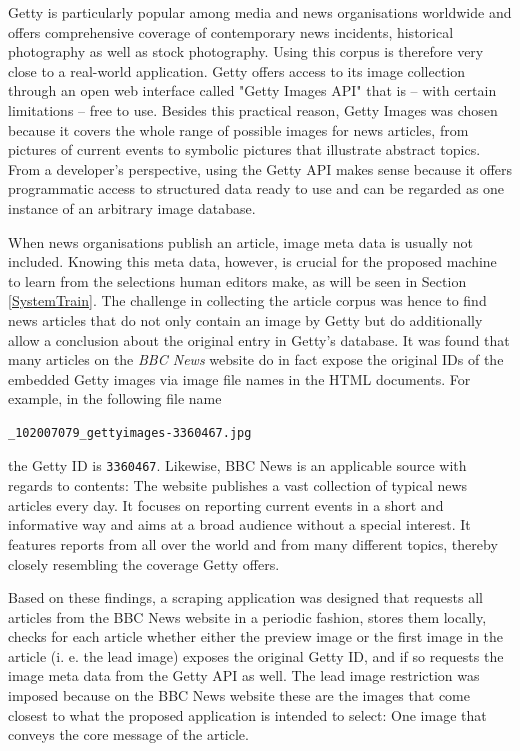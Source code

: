 \documentclass[11pt,a4paper,twoside]{article}
\begin{document}
Getty is particularly popular among media and news organisations worldwide and offers comprehensive coverage of contemporary news incidents, historical photography as well as stock photography. Using this corpus is therefore very close to a real-world application. Getty offers access to its image collection through an open web interface called "Getty Images API" \cite{GettyImagesAPIOverview} that is -- with certain limitations -- free to use. Besides this practical reason, Getty Images was chosen because it covers the whole range of possible images for news articles, from pictures of current events to symbolic pictures that illustrate abstract topics. From a developer's perspective, using the Getty API makes sense because it offers programmatic access to structured data ready to use and can be regarded as one instance of an arbitrary image database.

When news organisations publish an article, image meta data is usually not included. Knowing this meta data, however, is crucial for the proposed machine to learn from the selections human editors make, as will be seen in Section \ref{SystemTrain}. The challenge in collecting the article corpus was hence to find news articles that do not only contain an image by Getty but do additionally allow a conclusion about the original entry in Getty's database. It was found that many articles on the \emph{BBC News} website \cite{BBCBBCNews} do in fact expose the original IDs of the embedded Getty images via image file names in the HTML documents. For example, in the following file name

\begin{lstlisting}
_102007079_gettyimages-3360467.jpg
\end{lstlisting}

\noindent the Getty ID is \lstinline{3360467}. Likewise, BBC News is an applicable source with regards to contents: The website publishes a vast collection of typical news articles every day. It focuses on reporting current events in a short and informative way and aims at a broad audience without a special interest. It features reports from all over the world and from many different topics, thereby closely resembling the coverage Getty offers.

Based on these findings, a scraping application was designed that requests all articles from the BBC News website in a periodic fashion, stores them locally, checks for each article whether either the preview image or the first image in the article (i. e.  the lead image) exposes the original Getty ID, and if so requests the image meta data from the Getty API as well. The lead image restriction was imposed because on the BBC News website these are the images that come closest to what the proposed application is intended to select: One image that conveys the core message of the article.
\end{document}

